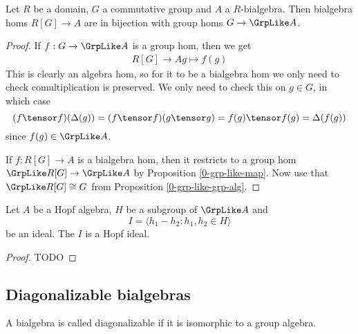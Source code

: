 \begin{proposition}
  \label{0-grp-alg-grp-like-gc}

  Let $R$ be a domain, $G$ a commutative group and $A$ a $R$-bialgebra.
  Then bialgebra homs $R[G] \to A$ are in bijection with group homs $G \to \GrpLike A$.
\end{proposition}
\begin{proof}

  If $f : G \to \GrpLike A$ is a group hom, then we get
  \begin{align*}
    R[G] \to A
    g \mapsto f(g)
  \end{align*}
  This is clearly an algebra hom,
  so for it to be a bialgebra hom we only need to check comultiplication is preserved.
  We only need to check this on $g \in G$, in which case
  \[(f \tensor f)(\Delta(g)) = (f \tensor f)(g \tensor g) = f(g) \tensor f(g) = \Delta(f(g))\]
  since $f(g) \in \GrpLike A$.

  If $f : R[G] \to A$ is a bialgebra hom,
  then it restricts to a group hom $\GrpLike R[G] \to \GrpLike A$
  by Proposition \ref{0-grp-like-map}.
  Now use that $\GrpLike R[G] \cong G$ from Proposition \ref{0-grp-like-grp-alg}.
\end{proof}

\begin{proposition}
  \label{0-grp-like-quot-hopf}

  Let $A$ be a Hopf algebra, $H$ be a subgroup of $\GrpLike A$ and
  \[
    I = \langle h_1 - h_2 : h_1,h_2 \in H \rangle
  \]
  be an ideal. The $I$ is a Hopf ideal.
\end{proposition}
\begin{proof}
  \uses{}

  TODO
\end{proof}

\subsection{Diagonalizable bialgebras}


\begin{definition}
  \label{0-is-diag-bialg}
  \uses{}
  \leanok

  A bialgebra is called diagonalizable if it is isomorphic to a group algebra.
\end{definition}


